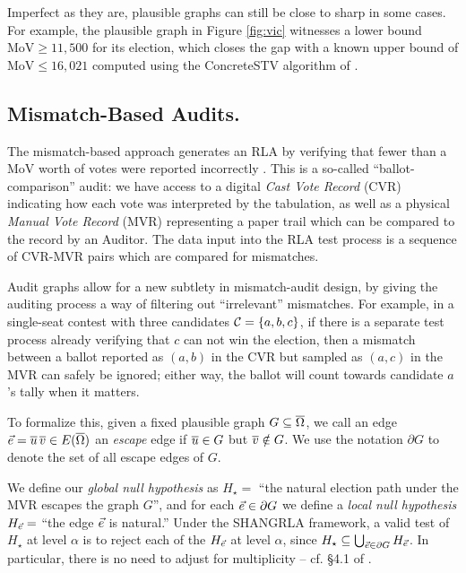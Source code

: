 Imperfect as they are, plausible graphs can still be close to sharp in some cases.
For example, the plausible graph in Figure \ref{fig:vic} witnesses a lower bound $\text{MoV}\geq 11,500$ for its election, which closes the gap with a known upper bound of $\text{MoV}\leq 16,021$ computed using the ConcreteSTV algorithm of \cite{blomAdvancesSTVMargin2026}.


\subsection{Mismatch-Based Audits.}\label{sec:mismatch}
The mismatch-based approach generates an RLA by verifying that fewer than a MoV worth of votes were reported incorrectly \cite{ekDoingMoreLess2026}. 
This is a so-called ``ballot-comparison'' audit: we have access to a digital \emph{Cast Vote Record} (CVR) indicating how each vote was interpreted by the tabulation, as well as a physical \emph{Manual Vote Record} (MVR) representing a paper trail which can be compared to the record by an Auditor.
The data input into the RLA test process is a sequence of CVR-MVR pairs which are compared for mismatches.

Audit graphs allow for a new subtlety in mismatch-audit design, by giving the auditing process a way of filtering out ``irrelevant'' mismatches. 
For example, in a single-seat contest with three candidates $\mathcal{C} = \{a, b, c\}$, if there is a separate test process already verifying that $c$ can not win the election, then a mismatch between a ballot reported as $(a,b)$ in the CVR but sampled as $(a, c)$ in the MVR can safely be ignored; either way, the ballot will count towards candidate $a$'s tally when it matters.

To formalize this, given a fixed plausible graph $G\subseteq \overline{\Omega}$, we call an edge $\ve = \ou\,\ov\in E(\oO)$ an \emph{escape} edge if $\overline{u}\in G$ but $\overline{v}\notin G$. 
We use the notation $\partial G$ to denote the set of all escape edges of $G$.

We define our \emph{global null hypothesis} as $H_{\star}=$ ``the natural election path under the MVR escapes the graph $G$'', and for each $\ve\in\pG$ we define a \emph{local null hypothesis} $H_{\ve}=$ ``the edge $\ve$ is natural.''
Under the SHANGRLA framework, a valid test of $H_{\star}$ at level $\alpha$ is to reject each of the $H_{\ve}$ at level $\alpha$, since $H_{\star}\subset \bigcup_{\ve\in\pG} H_{\ve}$. In particular, there is no need to adjust for multiplicity -- cf. \S4.1 of \cite{starkSetsHalfaverageNulls2020}.

